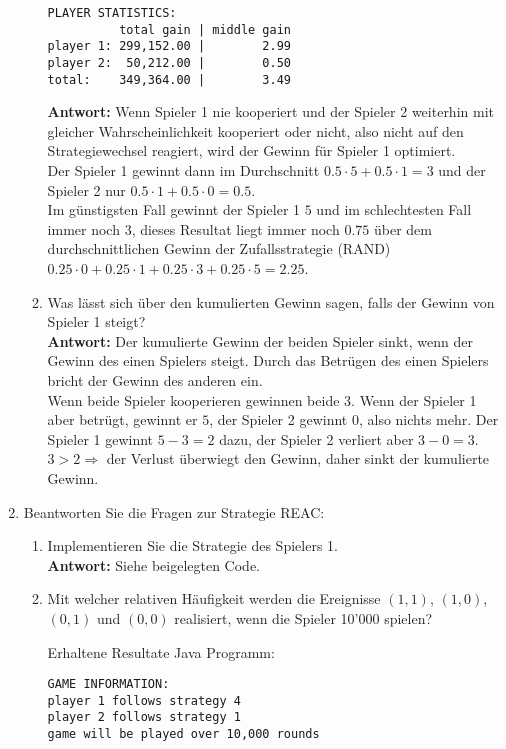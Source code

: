 \documentclass[12pt,a4paper]{article}
\begin{document}
\begin{enumerate}
\begin{enumerate}
\begin{verbatim}
PLAYER STATISTICS:
          total gain | middle gain
player 1: 299,152.00 |        2.99
player 2:  50,212.00 |        0.50
total:    349,364.00 |        3.49
\end{verbatim}
\textbf{Antwort:} Wenn Spieler 1 nie kooperiert und der Spieler 2 weiterhin mit gleicher Wahrscheinlichkeit kooperiert oder nicht,
also nicht auf den Strategiewechsel reagiert, wird der Gewinn für Spieler 1 optimiert.\\
Der Spieler 1 gewinnt dann im Durchschnitt $0.5 \cdot 5 + 0.5 \cdot 1 = 3$ und der Spieler 2 nur $0.5 \cdot 1 + 0.5 \cdot 0 = 0.5$.\\
Im günstigsten Fall gewinnt der Spieler 1 $5$ und im schlechtesten Fall immer noch $3$, dieses Resultat liegt immer noch $0.75$ über dem durchschnittlichen Gewinn der Zufallsstrategie (RAND) $0.25 \cdot 0 + 0.25 \cdot 1 + 0.25 \cdot 3 + 0.25 \cdot 5 = 2.25$.
\newpage

\item Was lässt sich über den kumulierten Gewinn sagen, falls der Gewinn von Spieler 1 steigt?\\
\textbf{Antwort:} Der kumulierte Gewinn der beiden Spieler sinkt, wenn der Gewinn des einen Spielers steigt.
Durch das Betrügen des einen Spielers bricht der Gewinn des anderen ein.\\
Wenn beide Spieler kooperieren gewinnen beide $3$. Wenn der Spieler 1 aber betrügt, gewinnt er $5$, der Spieler 2 gewinnt $0$, also nichts mehr.
Der Spieler 1 gewinnt $5 - 3 = 2$ dazu, der Spieler 2 verliert aber $3 - 0 = 3$.\\
$3 > 2 \Rightarrow$ der Verlust überwiegt den Gewinn, daher sinkt der kumulierte Gewinn.
\end{enumerate}

\item Beantworten Sie die Fragen zur Strategie REAC: 
\begin{enumerate}
\item Implementieren Sie die Strategie des Spielers 1.\\
\textbf{Antwort:} Siehe beigelegten Code.

\item Mit welcher relativen Häufigkeit werden die Ereignisse $(1, 1)$, $(1, 0)$, $(0, 1)$ und $(0, 0)$ realisiert, wenn die Spieler 10'000 spielen?\\
\begin{center}Erhaltene Resultate Java Programm:\end{center}
\begin{verbatim}
GAME INFORMATION:
player 1 follows strategy 4
player 2 follows strategy 1
game will be played over 10,000 rounds


\end{verbatim}
\end{enumerate}
\end{enumerate}
\end{document}
